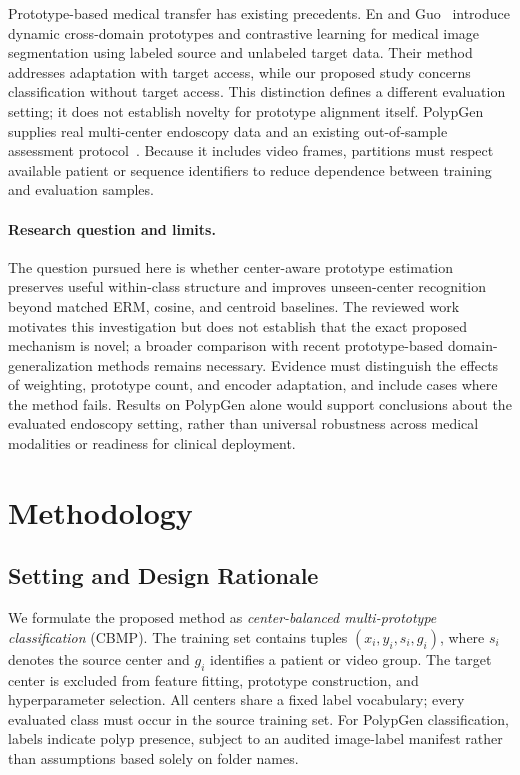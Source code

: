 Prototype-based medical transfer has existing precedents. En and Guo~\cite{en2024dpcl} introduce dynamic cross-domain prototypes and contrastive learning for medical image segmentation using labeled source and unlabeled target data. Their method addresses adaptation with target access, while our proposed study concerns classification without target access. This distinction defines a different evaluation setting; it does not establish novelty for prototype alignment itself. PolypGen supplies real multi-center endoscopy data and an existing out-of-sample assessment protocol~\cite{ali2023polypgen}. Because it includes video frames, partitions must respect available patient or sequence identifiers to reduce dependence between training and evaluation samples.

\paragraph{Research question and limits.}
The question pursued here is whether center-aware prototype estimation preserves useful within-class structure and improves unseen-center recognition beyond matched ERM, cosine, and centroid baselines. The reviewed work motivates this investigation but does not establish that the exact proposed mechanism is novel; a broader comparison with recent prototype-based domain-generalization methods remains necessary. Evidence must distinguish the effects of weighting, prototype count, and encoder adaptation, and include cases where the method fails. Results on PolypGen alone would support conclusions about the evaluated endoscopy setting, rather than universal robustness across medical modalities or readiness for clinical deployment.

\section{Methodology}
\label{sec:method}

\subsection{Setting and Design Rationale}
We formulate the proposed method as \emph{center-balanced multi-prototype classification} (CBMP). The training set contains tuples $(x_i,y_i,s_i,g_i)$, where $s_i$ denotes the source center and $g_i$ identifies a patient or video group. The target center is excluded from feature fitting, prototype construction, and hyperparameter selection. All centers share a fixed label vocabulary; every evaluated class must occur in the source training set. For PolypGen classification, labels indicate polyp presence, subject to an audited image-label manifest rather than assumptions based solely on folder names.

